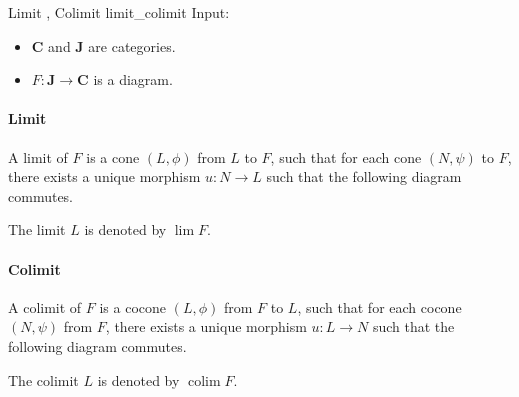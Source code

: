 \documentclass{article}
\begin{document}
\begin{definition}{Limit , Colimit }{limit_colimit}
    Input:
    \begin{itemize}
        \item $\mathbf{C}$ and $\mathbf{J}$ are categories.
        \item $F:\mathbf{J}\rightarrow\mathbf{C}$ is a diagram.
    \end{itemize}
    \paragraph*{Limit}
    A limit of $F$ is a cone $(L,\phi)$ from $L$ to $F$, such that for each cone $(N,\psi)$ to $F$, there exists a unique morphism $u: N\rightarrow L$ such that the following diagram commutes.
    \begin{center}
    \end{center}
    The limit $L$ is denoted by $\lim F$.
    \tcblower
    \paragraph*{Colimit}
    A colimit of $F$ is a cocone $(L,\phi)$ from $F$ to $L$, such that for each cocone $(N,\psi)$ from $F$, there exists a unique morphism $u: L\rightarrow N$ such that the following diagram commutes.
    \begin{center}
    \end{center}
    The colimit $L$ is denoted by $\operatorname{colim} F$.
\end{definition}
\end{document}
